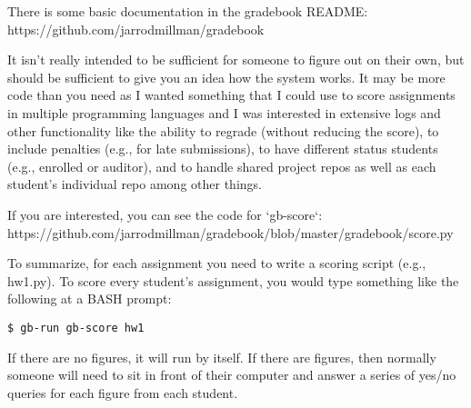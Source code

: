 There is some basic documentation in the gradebook README:
https://github.com/jarrodmillman/gradebook

It isn't really intended to be sufficient for someone to figure out on
their own, but should be sufficient to give you an idea how the system
works.  It may be more code than you need as I wanted something that I
could use to score assignments in multiple programming languages and I
was interested in extensive logs and other functionality like the
ability to regrade (without reducing the score), to include penalties
(e.g., for late submissions), to have different status students (e.g.,
enrolled or auditor), and to handle shared project repos as well as
each student's individual repo among other things.

If you are interested, you can see the code for `gb-score`:
https://github.com/jarrodmillman/gradebook/blob/master/gradebook/score.py

To summarize, for each assignment you need to write a scoring script
(e.g., hw1.py).  To score every student's assignment, you would type
something like the following at a BASH prompt:
\begin{verbatim}
$ gb-run gb-score hw1
\end{verbatim}

If there are no figures, it will run by itself.  If there are figures,
then normally someone will need to sit in front of their computer and
answer a series of yes/no queries for each figure from each student.

